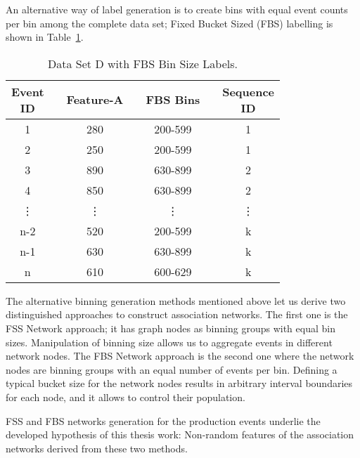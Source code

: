 An alternative way of label generation is to create bins with equal event counts per bin among the complete data set; Fixed Bucket Sized (FBS) labelling is shown in Table~\ref{Tab: D-dataset-FBS}.
\begin{table}[ht!]
	\centering
	\setlength{\arrayrulewidth}{0.75pt}%
	\begin{tabular}{|cc|c|ccc|c|}
		\hline \rowcolor[HTML]{FFFFC7}
		\makecell{Event\\ID} 	&& Feature-A    	&& FBS Bins && \makecell{Sequence\\ID} \\ \hline
		1 	      && 280	    && 200-599	&& 1 		     \\
		2 		  && 250	    && 200-599	&& 1 		     \\
		3 	      && 890	    && 630-899	&& 2 		     \\
		4 		  && 850	    && 630-899	&& 2 		     \\
		\vdots	  && \vdots  	&& \vdots	&& \vdots 	     \\
		n-2 	  && 520	    && 200-599	&& k 		     \\
		n-1       && 630	    && 630-899	&& k 		     \\
		n 		  && 610	    && 600-629	&& k 		     \\ \hline
	\end{tabular}
	\caption{Data Set D with FBS Bin Size Labels.}
	\label{Tab: D-dataset-FBS}
\end{table}
The alternative binning generation methods mentioned above let us derive two distinguished approaches to construct association networks. The first one is the FSS Network approach; it has graph nodes as binning groups with equal bin sizes. Manipulation of binning size allows us to aggregate events in different network nodes. The FBS Network approach is the second one where the network nodes are binning groups with an equal number of events per bin. Defining a typical bucket size for the network nodes results in arbitrary interval boundaries for each node, and it allows to control their population.


{\color{red}FSS and FBS networks generation for the production events underlie the developed hypothesis of this thesis work: Non-random features of the association networks derived from these two methods.}